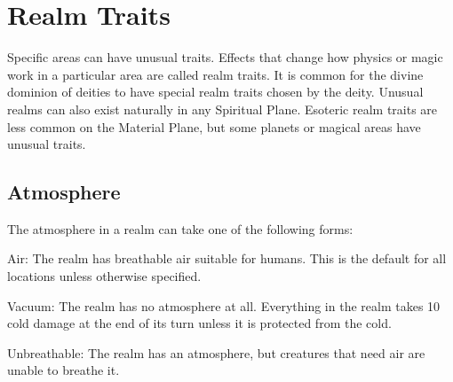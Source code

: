 \section{Realm Traits}

  Specific areas can have unusual traits.
  Effects that change how physics or magic work in a particular area are called realm traits.
  It is common for the divine dominion of deities to have special realm traits chosen by the deity.
  Unusual realms can also exist naturally in any Spiritual Plane.
  Esoteric realm traits are less common on the Material Plane, but some planets or magical areas have unusual traits.

  \subsection{Atmosphere}
    The atmosphere in a realm can take one of the following forms:
    \begin{raggeditemize}
      \item Air: The realm has breathable air suitable for humans.
        This is the default for all locations unless otherwise specified.
      \item Vacuum: The realm has no atmosphere at all.
        Everything in the realm takes 10 cold damage at the end of its turn unless it is protected from the cold.
      \item Unbreathable: The realm has an atmosphere, but creatures that need air are unable to breathe it.
    \end{raggeditemize}

